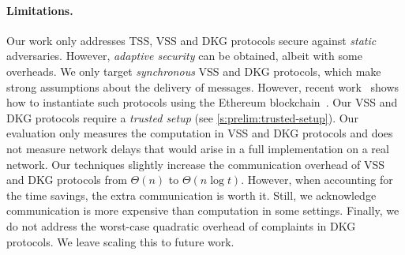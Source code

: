 \paragraph{Limitations.}
Our work only addresses TSS, VSS and DKG protocols secure against \textit{static} adversaries.
However, \textit{adaptive security} can be obtained, albeit with some overheads\cite{CGJ+99,Feldman87,AF04,FMY99,JL00}.
We only target \textit{synchronous} VSS and DKG protocols, which make strong assumptions about the delivery of messages.
However, recent work~\cite{SJSW19} shows how to instantiate such protocols using the Ethereum blockchain~\cite{ethereum}.
Our VSS and DKG protocols require a \textit{trusted setup} (see \cref{s:prelim:trusted-setup}).
Our evaluation only measures the computation in VSS and DKG protocols and does not measure network delays that would arise in a full implementation on a real network.
Our techniques slightly increase the communication overhead of VSS and DKG protocols from $\Theta(n)$ to $\Theta(n\log{t})$.
However, when accounting for the time savings, the extra communication is worth it.
Still, we acknowledge communication is more expensive than computation in some settings.
Finally, we do not address the worst-case quadratic overhead of complaints in DKG protocols.
We leave scaling this to future work.